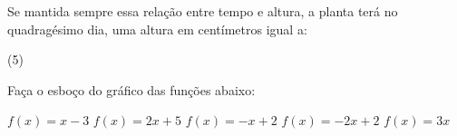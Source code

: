 \documentclass[a4paper,11pt,addpoints]{exam}
\begin{document}
\begin{questions}
    Se mantida sempre essa relação entre tempo e altura, a planta terá no
    quadragésimo dia, uma altura em centímetros igual a:

    \begin{tasks}(5)
    \end{tasks}

    \question[2]

    Faça o esboço do gráfico das funções abaixo:

    \begin{tasks}
        \task $f(x) = x - 3$
        \task $f(x) = 2x + 5$
        \task $f(x) = -x + 2$
        \task $f(x) = -2x + 2$
        \task $f(x) = 3x$
    \end{tasks}

\end{questions}
\end{document}
